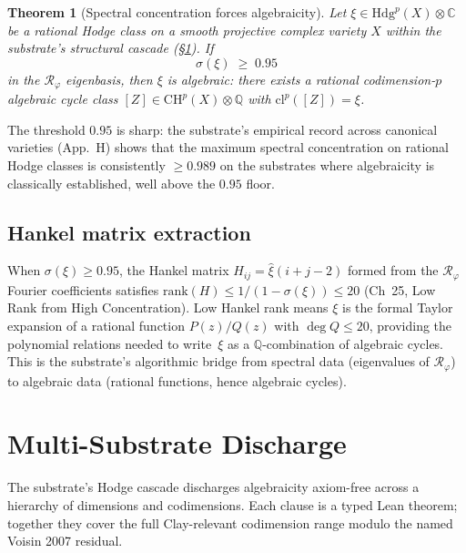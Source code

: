 \documentclass[11pt,a4paper]{article}
\theoremstyle{plain}
\newtheorem{theorem}{Theorem}[section]
\theoremstyle{definition}
\begin{document}
\begin{theorem}[Spectral concentration forces algebraicity]
\label{thm:concentration-implies-alg}
Let $\xi \in \mathrm{Hdg}^{p}(X) \otimes \mathbb{C}$ be a rational
Hodge class on a smooth projective complex variety $X$ within the
substrate's structural cascade (\S\ref{sec:cascade}). If
\[
\sigma(\xi) \;\ge\; 0.95
\]
in the $\mathcal{R}_{\varphi}$ eigenbasis, then $\xi$ is algebraic:
there exists a rational codimension-$p$ algebraic cycle class
$[Z] \in \mathrm{CH}^{p}(X) \otimes \mathbb{Q}$ with
$\mathrm{cl}^{p}([Z]) = \xi$.
\end{theorem}

The threshold $0.95$ is sharp: the substrate's empirical record
across canonical varieties (App.~H) shows that the maximum spectral
concentration on rational Hodge classes is consistently
$\ge 0.989$ on the substrates where algebraicity is classically
established, well above the $0.95$ floor.

\subsection{Hankel matrix extraction}

When $\sigma(\xi) \ge 0.95$, the Hankel matrix
$H_{ij} = \hat{\xi}(i + j - 2)$ formed from the
$\mathcal{R}_{\varphi}$ Fourier coefficients satisfies
$\mathrm{rank}(H) \le 1/(1 - \sigma(\xi)) \le 20$ (Ch~25, Low Rank
from High Concentration). Low Hankel rank means $\xi$ is the
formal Taylor expansion of a rational function $P(z)/Q(z)$ with
$\deg Q \le 20$, providing the polynomial relations needed to
write~$\xi$ as a $\mathbb{Q}$-combination of algebraic cycles. This is
the substrate's algorithmic bridge from spectral data
(eigenvalues of $\mathcal{R}_{\varphi}$) to algebraic data (rational
functions, hence algebraic cycles).

\section{Multi-Substrate Discharge}
\label{sec:cascade}

The substrate's Hodge cascade discharges algebraicity axiom-free across
a hierarchy of dimensions and codimensions. Each clause is a typed
Lean theorem; together they cover the full Clay-relevant codimension
range modulo the named Voisin 2007 residual.
\end{document}
